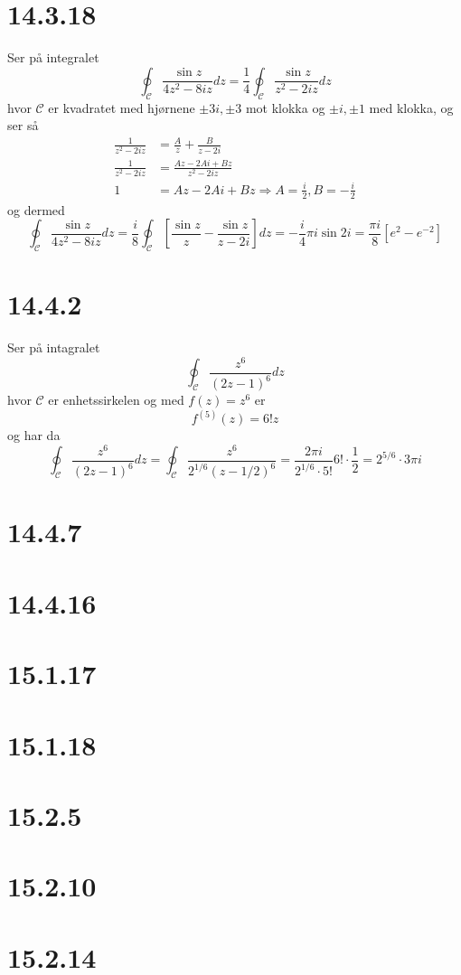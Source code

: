 \documentclass{report}
\newcommand{\bbrack}[1]{\left[ #1 \right]}
\begin{document}
\section*{14.3.18}
Ser på integralet
\begin{equation}
  \label{eq:7}
  \oint_{\mathcal{C}} \frac{\sin z}{4z^{2} - 8iz} dz = \frac{1}{4} \oint_{\mathcal{C}} \frac{\sin z}{z^{2} - 2iz} dz
\end{equation}
hvor $\mathcal{C}$ er kvadratet med hjørnene $\pm 3i, \pm 3$ mot klokka og $\pm i, \pm 1$ med klokka, og ser så
\begin{equation}
  \label{eq:8}
  \begin{split}
    \frac{1}{z^{2} - 2iz} &= \frac{A}{z} + \frac{B}{z - 2i} \\
    \frac{1}{z^{2} - 2iz} &= \frac{Az - 2Ai + Bz}{z^{2} - 2iz} \\
    1 &= Az - 2Ai + Bz \Rightarrow A = \frac{i}{2}, B = -\frac{i}{2}
  \end{split}
\end{equation}
og dermed
\begin{equation}
  \label{eq:9}
  \oint_{\mathcal{C}} \frac{\sin z}{4z^{2} - 8iz} dz = \frac{i}{8} \oint_{\mathcal{C}} \bbrack{ \frac{\sin z}{z} - \frac{\sin z}{z - 2i} }dz
  = -\frac{i}{4} \pi i \sin 2i = \frac{\pi i}{8} \bbrack{ e^{2} - e^{-2} }
\end{equation}


\section*{14.4.2}
Ser på intagralet
\begin{equation}
  \label{eq:10}
  \oint_{\mathcal{C}} \frac{z^{6}}{(2z-1)^{6}} dz
\end{equation}
hvor $\mathcal{C}$ er enhetssirkelen og med $f(z) = z^{6}$ er
\begin{equation}
  \label{eq:11}
  f^{(5)}(z) = 6! z
\end{equation}
og har da
\begin{equation}
  \label{eq:12}
  \oint_{\mathcal{C}} \frac{z^{6}}{(2z-1)^{6}} dz = \oint_{\mathcal{C}} \frac{z^{6}}{2^{1/6}(z-1/2)^{6}} = \frac{2\pi i}{2^{1/6}\cdot 5!} 6! \cdot \frac{1}{2} = 2^{5/6} \cdot 3\pi i
\end{equation}


\section*{14.4.7}
\section*{14.4.16}
\section*{15.1.17}
\section*{15.1.18}
\section*{15.2.5}
\section*{15.2.10}
\section*{15.2.14}
\end{document}
